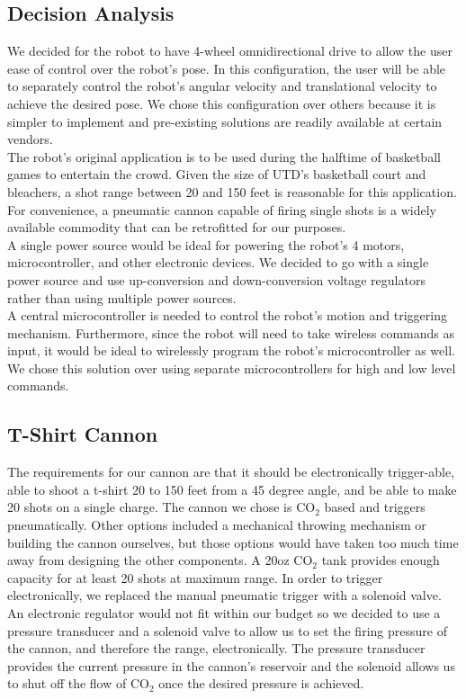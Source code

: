 \documentclass[letterpaper,12pt]{article}
\begin{document}
\subsection{Decision Analysis}
\noindent We decided for the robot to have 4-wheel omnidirectional drive to allow the user ease of control over the robot's pose. In this configuration, the user will be able to separately control the robot's angular velocity and translational velocity to achieve the desired pose. We chose this configuration over others because it is simpler to implement and pre-existing solutions are readily available at certain vendors. \\

\noindent The robot's original application is to be used during the halftime of basketball games to entertain the crowd. Given the size of UTD's basketball court and bleachers, a shot range between 20 and 150 feet is reasonable for this application. For convenience, a pneumatic cannon capable of firing single shots is a widely available commodity that can be retrofitted for our purposes. \\

\noindent A single power source would be ideal for powering the robot's 4 motors, microcontroller, and other electronic devices. We decided to go with a single power source and use up-conversion and down-conversion voltage regulators rather than using multiple power sources. \\

\noindent A central microcontroller is needed to control the robot's motion and triggering mechanism. Furthermore, since the robot will need to take wireless commands as input, it would be ideal to wirelessly program the robot's microcontroller as well. We chose this solution over using separate microcontrollers for high and low level commands. \\

\subsection{T-Shirt Cannon}
\noindent The requirements for our cannon are that it should be electronically trigger-able, able to shoot a t-shirt 20 to 150 feet from a 45 degree angle, and be able to make 20 shots on a single charge. The cannon we chose is CO$_2$ based and triggers pneumatically. Other options included a mechanical throwing mechanism or building the cannon ourselves, but those options would have taken too much time away from designing the other components. A 20oz CO$_2$ tank provides enough capacity for at least 20 shots at maximum range. In order to trigger electronically, we replaced the manual pneumatic trigger with a solenoid valve. An electronic regulator would not fit within our budget so we decided to use a pressure transducer and a solenoid valve to allow us to set the firing pressure of the cannon, and therefore the range, electronically. The pressure transducer provides the current pressure in the cannon's reservoir and the solenoid allows us to shut off the flow of CO$_2$ once the desired pressure is achieved.\\
\end{document}
